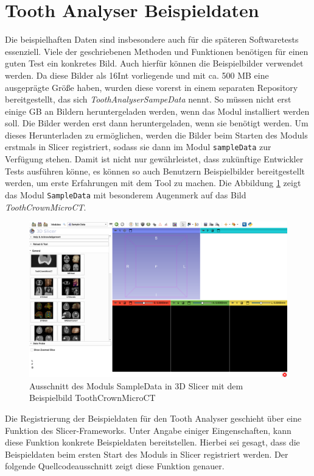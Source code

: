 \section{Tooth Analyser Beispieldaten}
\label{sec:beispieldaten} Die beispielhaften Daten sind insbesondere auch für
die späteren Softwaretests essenziell. Viele der geschriebenen Methoden und Funktionen
benötigen für einen guten Test ein konkretes Bild. Auch hierfür können die
Beispielbilder verwendet werden. Da diese Bilder als \ac{16Int} vorliegende und
mit ca. 500 \ac{MB} eine ausgeprägte Größe haben, wurden diese vorerst in einem separaten
Repository bereitgestellt, das sich \textit{ToothAnalyserSampeData} nennt. So
müssen nicht erst einige \ac{GB} an Bildern heruntergeladen werden, wenn das
Modul installiert werden soll. Die Bilder werden erst dann heruntergeladen, wenn
sie benötigt werden. Um dieses Herunterladen zu ermöglichen, werden die Bilder
beim Starten des Moduls erstmals in Slicer registriert, sodass sie dann im Modul
\texttt{sampleData} zur Verfügung stehen. Damit ist nicht nur gewährleistet,
dass zukünftige Entwickler Tests ausführen könne, es können so auch Benutzern Beispielbilder
bereitgestellt werden, um erste Erfahrungen mit dem Tool zu machen. Die Abbildung
\ref{fig:sample_data} zeigt das Modul \texttt{SampleData} mit besonderem
Augenmerk auf das Bild \textit{ToothCrownMicroCT}.

\begin{figure}[h]
	\centering
	\includegraphics[width=1\textwidth]{img/sampleData.png}
	\caption{Ausschnitt des Moduls SampleData in 3D Slicer mit dem Beispielbild
	ToothCrownMicroCT}
	\label{fig:sample_data}
\end{figure}

Die Registrierung der Beispieldaten für den Tooth Analyser geschieht über eine
Funktion des Slicer-Frameworks. Unter Angabe einiger Eingenschaften, kann diese
Funktion konkrete Beispieldaten bereitstellen. Hierbei sei gesagt, dass die
Beispieldaten beim ersten Start des Moduls in Slicer registriert werden. Der folgende
Quellcodeausschnitt zeigt diese Funktion genauer.

